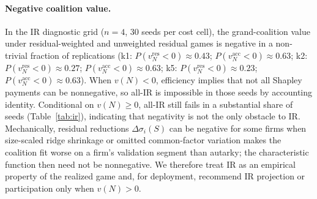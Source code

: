 \paragraph{Negative coalition value.}
In the IR diagnostic grid ($n=4$, 30 seeds per cost cell), the grand-coalition value under residual-weighted and unweighted residual games is negative in a non-trivial fraction of replications (k1: $P(v_N^{\mathrm{res}}<0)\approx 0.43$; $P(v_N^{\mathrm{acc}}<0)\approx 0.63$; k2: $P(v_N^{\mathrm{res}}<0)\approx 0.27$; $P(v_N^{\mathrm{acc}}<0)\approx 0.63$; k5: $P(v_N^{\mathrm{res}}<0)\approx 0.23$; $P(v_N^{\mathrm{acc}}<0)\approx 0.63$). When $v(N)<0$, efficiency implies that not all Shapley payments can be nonnegative, so all-IR is impossible in those seeds by accounting identity. Conditional on $v(N)\ge 0$, all-IR still fails in a substantial share of seeds (Table~\ref{tab:ir}), indicating that negativity is not the only obstacle to IR. Mechanically, residual reductions $\Delta\sigma_i(S)$ can be negative for some firms when size-scaled ridge shrinkage or omitted common-factor variation makes the coalition fit worse on a firm's validation segment than autarky; the characteristic function then need not be nonnegative. We therefore treat IR as an empirical property of the realized game and, for deployment, recommend IR projection or participation only when $v(N)>0$.
